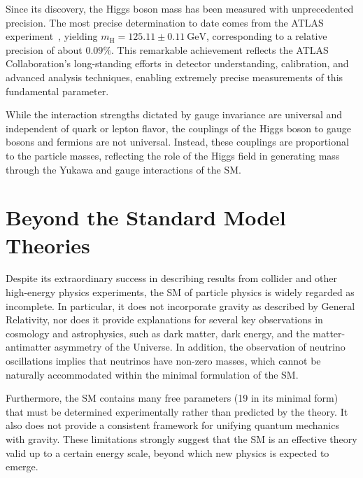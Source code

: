 Since its discovery, the Higgs boson mass has been measured with unprecedented precision. The most precise determination to date comes from the ATLAS experiment~\cite{ATLAS2023HiggsMass}, yielding $m_{\text{H}} = 125.11 \pm 0.11~\text{GeV}$, corresponding to a relative precision of about $0.09\%$. This remarkable achievement reflects the ATLAS Collaboration's long-standing efforts in detector understanding, calibration, and advanced analysis techniques, enabling extremely precise measurements of this fundamental parameter.

While the interaction strengths dictated by gauge invariance are universal and independent of quark or lepton flavor, the couplings of the Higgs boson to gauge bosons and fermions are not universal. Instead, these couplings are proportional to the particle masses, reflecting the role of the Higgs field in generating mass through the Yukawa and gauge interactions of the SM.

\section{Beyond the Standard Model Theories}

Despite its extraordinary success in describing results from collider and other high-energy physics experiments, the SM of particle physics is widely regarded as incomplete. In particular, it does not incorporate gravity as described by General Relativity, nor does it provide explanations for several key observations in cosmology and astrophysics, such as dark matter, dark energy, and the matter-antimatter asymmetry of the Universe. In addition, the observation of neutrino oscillations implies that neutrinos have non-zero masses, which cannot be naturally accommodated within the minimal formulation of the SM.

Furthermore, the SM contains many free parameters (19 in its minimal form) that must be determined experimentally rather than predicted by the theory. It also does not provide a consistent framework for unifying quantum mechanics with gravity. These limitations strongly suggest that the SM is an effective theory valid up to a certain energy scale, beyond which new physics is expected to emerge.

